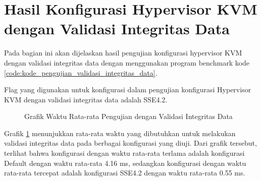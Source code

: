 \section{Hasil Konfigurasi Hypervisor KVM dengan Validasi Integritas Data}
Pada bagian ini akan dijelaskan hasil pengujian konfigurasi hypervisor KVM dengan validasi integritas data dengan menggunakan program benchmark kode \ref{code:kode_pengujian_validasi_integritas_data}.

Flag yang digunakan untuk konfigurasi dalam pengujian konfigurasi Hypervisor KVM dengan validasi integritas data adalah SSE4.2.

\begin{figure}
    \centering
    \caption{Grafik Waktu Rata-rata Pengujian dengan Validasi Integritas Data}
    \label{fig:file_integrity_test_average_graph}
\end{figure}

Grafik \ref{fig:file_integrity_test_average_graph} menunjukkan rata-rata waktu yang dibutuhkan untuk melakukan validasi integritas data pada berbagai konfigurasi yang diuji. Dari grafik tersebut, terlihat bahwa konfigurasi dengan waktu rata-rata terlama adalah konfigurasi Default dengan waktu rata-rata 4.16 ms, sedangkan konfigurasi dengan waktu rata-rata tercepat adalah konfigurasi SSE4.2 dengan waktu rata-rata 0.55 ms.

